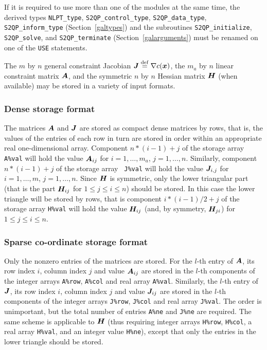 \documentclass{galahad}
\newcommand{\Grad}{\nabla}
\begin{document}

\galhowto



\noindent
If it is required to use more than one of the modules at the same time, 
the derived types
{\tt NLPT\_type}, {\tt S2QP\_control\_type}, {\tt S2QP\_data\_type}, 
{\tt S2QP\_inform\_type} (Section~\ref{galtypes})
and the subroutines {\tt S2QP\_initialize}, {\tt S2QP\_solve}, and
{\tt S2QP\_terminate} (Section~\ref{galarguments}) must be renamed on
one of the {\tt USE} statements.


\galmatrix The $m$ by $n$ general constraint Jacobian $\bmJ \eqdef
\Grad c(\bmx)$, the $m_a$ by $n$ linear constraint matrix ${\bm{A}}$, and
the symmetric $n$ by $n$ Hessian matrix ${\bm{H}}$ (when available) may
be stored in a variety of input formats.

\subsubsection{Dense storage format}\label{dense}
The matrices ${\bm{A}}$ and ${\bm{J}}$ are stored as compact dense matrices by
rows, that is, the values of the entries of each row in turn are
stored in order within an appropriate real one-dimensional array.
Component $n \ast (i-1) + j$ of the storage array {\tt A\%val} will
hold the value ${\bm{A}}_{ij}$ for $i = 1, \ldots , m_a$, $j = 1, \ldots ,
n$.  Similarly, component $n \ast (i-1) + j$ of the storage array {\tt
  J\%val} will hold the value ${\bm{J}}_{i,j}$ for $i = 1, \ldots , m$, $j =
1, \ldots , n$.  Since ${\bm{H}}$ is symmetric, only the lower triangular
part (that is the part ${\bm{H}}_{ij}$ for $1 \leq j \leq i \leq n$)
should be stored. In this case the lower triangle will be stored by rows, that is
component $i \ast (i-1)/2 + j$ of the storage array {\tt H\%val} will
hold the value ${\bm{H}}_{ij}$ (and, by symmetry, ${\bm{H}}_{ji}$) for $1 \leq j
\leq i \leq n$.

\subsubsection{Sparse co-ordinate storage format}\label{coordinate}
Only the nonzero entries of the matrices are stored. For the $l$-th
entry of ${\bm{A}}$, its row index $i$, column index $j$ and value
${\bm{A}}_{ij}$ are stored in the $l$-th components of the integer arrays
{\tt A\%row}, {\tt A\%col} and real array {\tt A\%val}.  Similarly,
the $l$-th entry of ${\bm{J}}$, its row index $i$, column index $j$ and
value ${\bm{J}}_{ij}$ are stored in the $l$-th components of the integer
arrays {\tt J\%row}, {\tt J\%col} and real array {\tt J\%val}.  The
order is unimportant, but the total number of entries {\tt A\%ne} and
{\tt J\%ne} are required.  The same scheme is applicable to ${\bm{H}}$
(thus requiring integer arrays {\tt H\%row}, {\tt H\%col}, a real
array {\tt H\%val}, and an integer value {\tt H\%ne}), except that only
the entries in the lower triangle should be stored.
\end{document}
